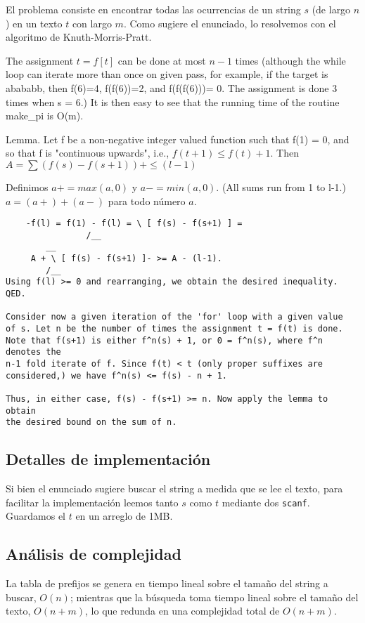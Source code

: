 El problema consiste en encontrar todas las ocurrencias de un string $s$ (de
largo $n$) en un texto $t$ con largo $m$. Como sugiere el enunciado, lo
resolvemos con el algoritmo de Knuth-Morris-Pratt.


\vspace{.3cm}
The assignment $t = f[t]$ can be done at most $n-1$ times (although the
while loop can iterate more than once on given pass, for example,
if the target is abababb, then f(6)=4, f(f(6))=2, and f(f(f(6)))= 0.
The assignment is done 3 times when s = 6.) It is then easy to see that
the running time of the routine make\_pi is O(m).

Lemma. Let f be a non-negative integer valued function such that
f(1) = 0, and so that f is "continuous upwards", i.e., $f(t+1) \le f(t) + 1$.
Then $A=\sum{(f(s) - f(s+1))+ \le (l-1)}$

Definimos $a+ = max(a,0)$ y $a- = min(a,0)$. (All sums run from 1 to l-1.)
$a = (a+) + (a-)$ para todo número $a$.

\begin{verbatim}
	-f(l) = f(1) - f(l) = \ [ f(s) - f(s+1) ] =
				/__
		__
     A + \ [ f(s) - f(s+1) ]- >= A - (l-1).
		/__
Using f(l) >= 0 and rearranging, we obtain the desired inequality.
QED.

Consider now a given iteration of the 'for' loop with a given value
of s. Let n be the number of times the assignment t = f(t) is done.
Note that f(s+1) is either f^n(s) + 1, or 0 = f^n(s), where f^n denotes the
n-1 fold iterate of f. Since f(t) < t (only proper suffixes are
considered,) we have f^n(s) <= f(s) - n + 1.

Thus, in either case, f(s) - f(s+1) >= n. Now apply the lemma to obtain
the desired bound on the sum of n.
\end{verbatim}

\subsection*{Detalles de implementación}

Si bien el enunciado sugiere buscar el string a medida que se lee el texto, para
facilitar la implementación leemos tanto $s$ como $t$ mediante dos {\tt scanf}.
Guardamos el $t$ en un arreglo de 1MB.

\subsection*{Análisis de complejidad}

La tabla de prefijos se genera en tiempo lineal sobre el tamaño del string a
buscar, $O(n)$; mientras que la búsqueda toma tiempo lineal sobre el tamaño
del texto, $O(n+m)$, lo que redunda en una complejidad total de $O(n+m)$.
